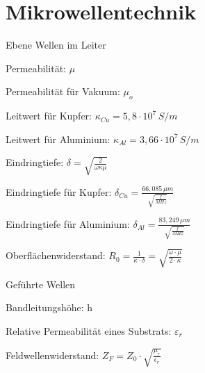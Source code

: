 \documentclass[german]{latex4ei/latex4ei_sheet}
\begin{document}
\section{Mikrowellentechnik}
    \begin{sectionbox}{Ebene Wellen im Leiter}
        \item Permeabilität: $\mu$
        \item Permeabilität für Vakuum: $\mu_o$
        \item Leitwert für Kupfer: $\kappa_{Cu} = 5,8 \cdot 10^7\, S/m$
        \item Leitwert für Aluminium: $\kappa_{Al} = 3,66 \cdot 10^7\, S/m$
        \item Eindringtiefe: $\delta = \sqrt{\frac{2}{\omega \kappa \mu}}$
        \item Eindringtiefe für Kupfer: $\delta_{Cu} = \frac{66,085\,\mu m}{\sqrt{\frac{f}{MHz}}}$
        \item Eindringtiefe für Aluminium: $\delta_{Al} = \frac{83,249\,\mu m}{\sqrt{\frac{f}{MHz}}}$
        \item Oberflächenwiderstand: $R_0 = \frac{1}{\kappa \cdot \delta} = \sqrt{\frac{\omega\cdot \mu}{2\cdot \kappa}}$
    \end{sectionbox}
    \begin{sectionbox}{Geführte Wellen}
        \item Bandleitungshöhe: h
        \item Relative Permeabilität eines Substrats: $\varepsilon_r$
        \item Feldwellenwiderstand: $Z_F = Z_0 \cdot \sqrt{\frac{\mu_r}{\epsilon_r}}$
    \end{sectionbox}
\end{document}
